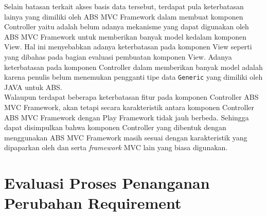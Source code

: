 Selain batasan terkait akses basis data tersebut, terdapat pula keterbatasan lainya yang dimiliki oleh ABS MVC Framework dalam membuat komponen Controller yaitu adalah belum adanya mekanisme yang dapat digunakan oleh ABS MVC Framework untuk memberikan banyak model kedalam komponen View. Hal ini menyebabkan adanya keterbatasan pada komponen View seperti yang dibahas pada bagian evaluasi pembuatan komponen View. Adanya keterbatasan pada komponen Controller dalam memberikan banyak model adalah karena penulis belum menemukan pengganti tipe data \texttt{Generic} yang dimiliki oleh JAVA untuk ABS.\\

Walaupun terdapat beberapa keterbatasan fitur pada komponen Controller ABS MVC Framework, akan tetapi secara karakteristik antara komponen Controller ABS MVC Framework dengan Play Framework tidak jauh berbeda. Sehingga dapat disimpulkan bahwa komponen Controller yang dibentuk dengan menggunakan ABS MVC Framework masih sesuai dengan karakteristik yang dipaparkan oleh \cite{krasner1988desc} dan \cite{leff2001web} serta \textit{framework} MVC lain yang biasa digunakan.

\section{Evaluasi Proses Penanganan Perubahan Requirement}

